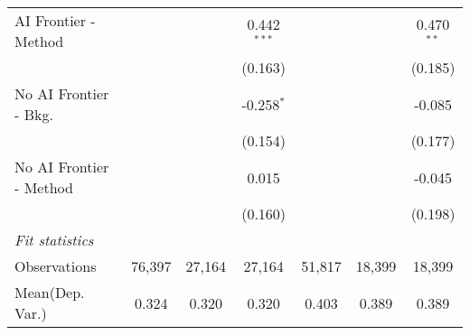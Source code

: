 \begin{tabular}{lcccccc}
   AI Frontier - Method    &               &               & 0.442$^{***}$ &               &               & 0.470$^{**}$\\   
                           &               &               & (0.163)       &               &               & (0.185)\\   
   No AI Frontier - Bkg.   &               &               & -0.258$^{*}$  &               &               & -0.085\\   
                           &               &               & (0.154)       &               &               & (0.177)\\   
   No AI Frontier - Method &               &               & 0.015         &               &               & -0.045\\   
                           &               &               & (0.160)       &               &               & (0.198)\\   
   \midrule
   \emph{Fit statistics}\\
   Observations            & 76,397        & 27,164        & 27,164        & 51,817        & 18,399        & 18,399\\  
Mean(Dep. Var.) & 0.324 & 0.320 & 0.320 & 0.403 & 0.389 & 0.389 \\
   

\end{tabular}

